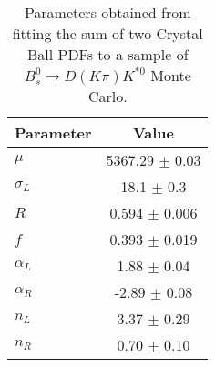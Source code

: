 \begin{table}[h]
  \centering
  \begin{tabular}{lc}
      \toprule
      Parameter & Value \\
      \midrule
      $\mu$ & 5367.29 $\pm$ 0.03 \\
      $\sigma_L$ & 18.1 $\pm$ 0.3 \\
      $R$ & 0.594 $\pm$ 0.006 \\
      $f$ & 0.393 $\pm$ 0.019 \\
      $\alpha_L$ & 1.88 $\pm$ 0.04 \\
      $\alpha_R$ & -2.89 $\pm$ 0.08 \\
      $n_L$ & 3.37 $\pm$ 0.29 \\
      $n_R$ & 0.70 $\pm$ 0.10 \\
  \bottomrule
  \end{tabular}
  \caption{Parameters obtained from fitting the sum of two Crystal Ball PDFs to a sample of $B^0_s \to D(K\pi)K^{*0}$ Monte Carlo.}
\label{tab:signal_Bs_MC_params}
\end{table}
